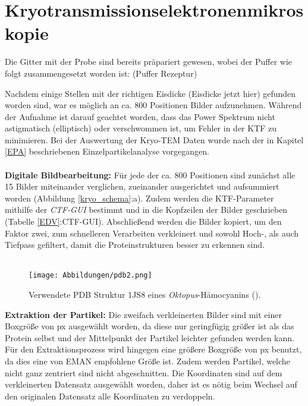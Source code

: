 \section{Kryotransmissionselektronenmikroskopie} %
\label{sec:kryopraeparation}

Die Gitter mit der Probe sind bereits präpariert gewesen, wobei der Puffer wie folgt zusammengesetzt worden ist: 
(Puffer Rezeptur)

Nachdem einige Stellen mit der richtigen Eisdicke (Eisdicke jetzt hier) gefunden worden sind, war es möglich an ca. 800 Positionen Bilder aufzunehmen.
Während der Aufnahme ist darauf geachtet worden, dass das Power Spektrum nicht astigmatisch (elliptisch) oder verschwommen ist, um Fehler in der KTF zu minimieren.
Bei der Auswertung der Kryo-TEM Daten wurde nach der in Kapitel \ref{EPA} beschriebenen Einzelpartikelanalyse vorgegangen.
\\
\\
\textbf{Digitale Bildbearbeitung:}
Für jede der ca. 800 Positionen sind zunächst alle 15 Bilder miteinander verglichen, zueinander ausgerichtet und aufsummiert worden (Abbildung \ref{kryo_schema}:a).
Zudem werden die KTF-Parameter mithilfe der \textit{CTF-GUI} bestimmt und in die Kopfzeilen der Bilder geschrieben (Tabelle \ref{EDV}:CTF-GUI).
Abschließend werden die Bilder kopiert, um den Faktor zwei, zum schnelleren Verarbeiten verkleinert und sowohl Hoch-, als auch Tiefpass gefiltert, damit die Proteinstrukturen besser zu erkennen sind.
\\
\\
\begin{wrapfigure}{r}{0.2\textwidth}
	\centering
	\texttt{[image: Abbildungen/pdb2.png]}
	\caption[Darstellung der Oktopus Röntgenkristallstruktur]{Verwendete PDB Struktur 1JS8 eines \textit{Oktopus}-Hämocyanins (\cite{pdb}).}
	\label{octo}
\end{wrapfigure}
\textbf{Extraktion der Partikel:}
Die zweifach verkleinerten Bilder sind mit einer Boxgröße von \unit[196]{px} ausgewählt worden, da diese nur geringfügig größer ist als das Protein selbst und der Mittelpunkt der Partikel leichter gefunden werden kann.
Für den Extraktionsprozess wird hingegen eine größere Boxgröße von \unit[256]{px} benutzt, da dies eine von EMAN empfohlene Größe ist.
Zudem werden Partikel, welche nicht ganz zentriert sind nicht abgeschnitten.
Die Koordinaten sind auf dem verkleinerten Datensatz ausgewählt worden, daher ist es nötig beim Wechsel auf den originalen Datensatz alle Koordinaten zu verdoppeln.
